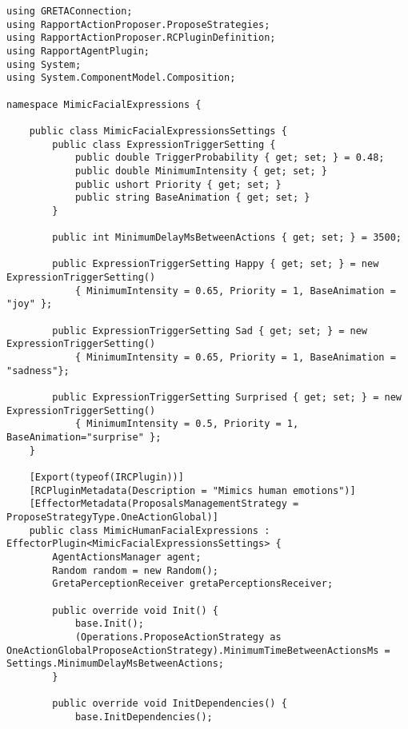 \begin{lstlisting}[language=CSharp, caption={Example definition of an \textit{Effector} Plugin that mimics facial expressions using event handlers.},classoffset=2,morekeywords={RenderState,PrimitiveRestart,FacetCulling,RasterizationMode,ScissorTest,StencilTest,DepthTest,DepthRange,Blending,ColorMask},label={lst:facialExpressionsSourceCode}]
using GRETAConnection;
using RapportActionProposer.ProposeStrategies;
using RapportActionProposer.RCPluginDefinition;
using RapportAgentPlugin;
using System;
using System.ComponentModel.Composition;

namespace MimicFacialExpressions {

    public class MimicFacialExpressionsSettings {
        public class ExpressionTriggerSetting {
            public double TriggerProbability { get; set; } = 0.48;
            public double MinimumIntensity { get; set; }
            public ushort Priority { get; set; }
            public string BaseAnimation { get; set; }
        }
        
        public int MinimumDelayMsBetweenActions { get; set; } = 3500;
        
        public ExpressionTriggerSetting Happy { get; set; } = new ExpressionTriggerSetting() 
            { MinimumIntensity = 0.65, Priority = 1, BaseAnimation = "joy" };

        public ExpressionTriggerSetting Sad { get; set; } = new ExpressionTriggerSetting() 
            { MinimumIntensity = 0.65, Priority = 1, BaseAnimation = "sadness"};

        public ExpressionTriggerSetting Surprised { get; set; } = new ExpressionTriggerSetting() 
            { MinimumIntensity = 0.5, Priority = 1, BaseAnimation="surprise" };
    }

    [Export(typeof(IRCPlugin))]
    [RCPluginMetadata(Description = "Mimics human emotions")]
    [EffectorMetadata(ProposalsManagementStrategy = ProposeStrategyType.OneActionGlobal)]
    public class MimicHumanFacialExpressions : EffectorPlugin<MimicFacialExpressionsSettings> {
        AgentActionsManager agent;
        Random random = new Random();
        GretaPerceptionReceiver gretaPerceptionsReceiver;

        public override void Init() {
            base.Init();
            (Operations.ProposeActionStrategy as OneActionGlobalProposeActionStrategy).MinimumTimeBetweenActionsMs = Settings.MinimumDelayMsBetweenActions;
        }

        public override void InitDependencies() {
            base.InitDependencies();


\end{lstlisting}
